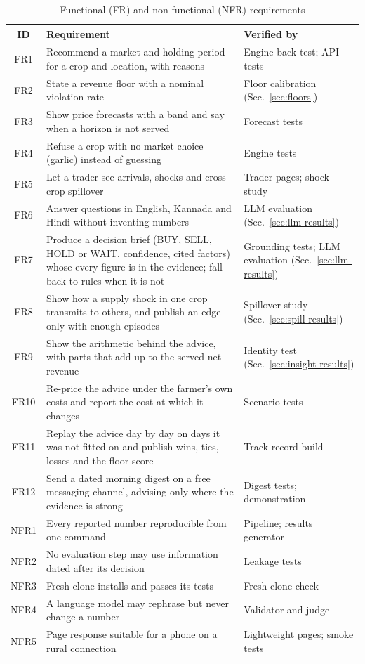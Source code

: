 \begin{table}[!t]
\centering
\caption{Functional (FR) and non-functional (NFR) requirements}
\label{tab:requirements}
\small
\begin{tabular}{|c|p{9.2cm}|p{3.2cm}|}
\hline
\textbf{ID} & \textbf{Requirement} & \textbf{Verified by} \\ \hline
FR1 & Recommend a market and holding period for a crop and location, with reasons & Engine back-test; API tests \\ \hline
FR2 & State a revenue floor with a nominal violation rate & Floor calibration (Sec.~\ref{sec:floors}) \\ \hline
FR3 & Show price forecasts with a band and say when a horizon is not served & Forecast tests \\ \hline
FR4 & Refuse a crop with no market choice (garlic) instead of guessing & Engine tests \\ \hline
FR5 & Let a trader see arrivals, shocks and cross-crop spillover & Trader pages; shock study \\ \hline
FR6 & Answer questions in English, Kannada and Hindi without inventing numbers & LLM evaluation (Sec.~\ref{sec:llm-results}) \\ \hline
FR7 & Produce a decision brief (BUY, SELL, HOLD or WAIT, confidence, cited factors) whose every figure is in the evidence; fall back to rules when it is not & Grounding tests; LLM evaluation (Sec.~\ref{sec:llm-results}) \\ \hline
FR8 & Show how a supply shock in one crop transmits to others, and publish an edge only with enough episodes & Spillover study (Sec.~\ref{sec:spill-results}) \\ \hline
FR9 & Show the arithmetic behind the advice, with parts that add up to the served net revenue & Identity test (Sec.~\ref{sec:insight-results}) \\ \hline
FR10 & Re-price the advice under the farmer's own costs and report the cost at which it changes & Scenario tests \\ \hline
FR11 & Replay the advice day by day on days it was not fitted on and publish wins, ties, losses and the floor score & Track-record build \\ \hline
FR12 & Send a dated morning digest on a free messaging channel, advising only where the evidence is strong & Digest tests; demonstration \\ \hline
NFR1 & Every reported number reproducible from one command & Pipeline; results generator \\ \hline
NFR2 & No evaluation step may use information dated after its decision & Leakage tests \\ \hline
NFR3 & Fresh clone installs and passes its tests & Fresh-clone check \\ \hline
NFR4 & A language model may rephrase but never change a number & Validator and judge \\ \hline
NFR5 & Page response suitable for a phone on a rural connection & Lightweight pages; smoke tests \\ \hline
\end{tabular}
\end{table}

